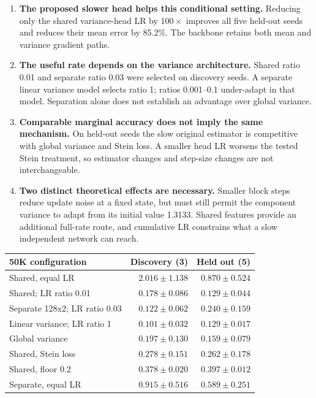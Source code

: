 \documentclass[11pt,a4paper]{article}
\begin{document}
\begin{enumerate}
\item \textbf{The proposed slower head helps this conditional setting.} Reducing only the shared variance-head LR by $100\times$ improves all five held-out seeds and reduces their mean error by 85.2\%. The backbone retains both mean and variance gradient paths.
\item \textbf{The useful rate depends on the variance architecture.} Shared ratio 0.01 and separate ratio 0.03 were selected on discovery seeds. A separate linear variance model selects ratio 1; ratios 0.001--0.1 under-adapt in that model. Separation alone does not establish an advantage over global variance.
\item \textbf{Comparable marginal accuracy does not imply the same mechanism.} On held-out seeds the slow original estimator is competitive with global variance and Stein loss. A smaller head LR worsens the tested Stein treatment, so estimator changes and step-size changes are not interchangeable.
\item \textbf{Two distinct theoretical effects are necessary.} Smaller block steps reduce update noise at a fixed state, but must still permit the component variance to adapt from its initial value 1.3133. Shared features provide an additional full-rate route, and cumulative LR constrains what a slow independent network can reach.
\end{enumerate}

\begin{center}\small
\begin{tabular}{@{}>{\raggedright\arraybackslash}p{7cm}rr@{}}
\toprule
50K configuration & Discovery (3) & Held out (5) \\ \midrule
Shared, equal LR & $2.016\pm1.138$ & $0.870\pm0.524$ \\
Shared; LR ratio 0.01 & $0.178\pm0.086$ & $0.129\pm0.044$ \\
Separate 128x2; LR ratio 0.03 & $0.122\pm0.062$ & $0.240\pm0.159$ \\
Linear variance; LR ratio 1 & $0.101\pm0.032$ & $0.129\pm0.017$ \\
Global variance & $0.197\pm0.130$ & $0.159\pm0.079$ \\
Shared, Stein loss & $0.278\pm0.151$ & $0.262\pm0.178$ \\
Shared, floor 0.2 & $0.378\pm0.020$ & $0.397\pm0.012$ \\
Separate, equal LR & $0.915\pm0.516$ & $0.589\pm0.251$ \\
\bottomrule\end{tabular}
\end{center}
\end{document}
